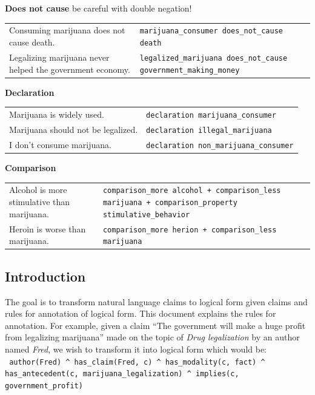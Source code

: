 \noindent \textbf{Does not cause} be careful with double negation! \\
\begin{tabular}{p{8cm} p{8cm}}
	Consuming marijuana does not cause death. & \texttt{marijuana\_consumer does\_not\_cause death} \\
	Legalizing marijuana never helped the government economy. & \texttt{legalized\_marijuana does\_not\_cause government\_making\_money}
\end{tabular}

\noindent \textbf{Declaration} \\
\begin{tabular}{p{8cm} p{8cm}}
	Marijuana is widely used. & \texttt{declaration marijuana\_consumer}  \\
	Marijuana should not be legalized. & \texttt{declaration illegal\_marijuana} \\
	I don’t consume marijuana.  & \texttt{declaration non\_marijuana\_consumer}
\end{tabular}

\noindent \textbf{Comparison} \\
\begin{tabular}{p{8cm} p{8cm}}
	Alcohol is more stimulative than marijuana. & \texttt{comparison\_more alcohol + comparison\_less marijuana + comparison\_property stimulative\_behavior}\\
	Heroin is worse than marijuana. & \texttt{comparison\_more herion + comparison\_less marijuana}
\end{tabular}

\subsection{Introduction}

The goal is to transform natural language claims to logical form given claims
and rules for annotation of logical form. This document explains the rules for
annotation. For example, given a claim ``The government will make a huge profit
from legalizing marijuana'' made on the topic of \textit{Drug legalization} by an author
named \textit{Fred}, we wish to transform it into logical form which would be: \\

\noindent \texttt{
author(Fred) \^{} has\_claim(Fred, c) \^{} has\_modality(c, fact) 
\^{} has\_antecedent(c, marijuana\_legalization) 
\^{} implies(c, government\_profit)
} \\


